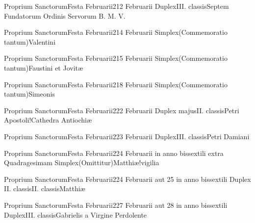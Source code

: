 \documentclass[nocturnale-romanum.tex]{subfiles}
\begin{document}
	{Proprium Sanctorum}{Festa Februarii}{2}{12 Februarii}
	{Duplex}{III. classis}{Septem Fundatorum Ordinis Servorum B. M. V.}
	{}
	{}

	{Proprium Sanctorum}{Festa Februarii}{2}{14 Februarii}
	{Simplex}{(Commemoratio tantum)}{Valentini}
	{}
	{}

	{Proprium Sanctorum}{Festa Februarii}{2}{15 Februarii}
	{Simplex}{(Commemoratio tantum)}{Faustini et Jovitæ}
	{}
	{}

	{Proprium Sanctorum}{Festa Februarii}{2}{18 Februarii}
	{Simplex}{(Commemoratio tantum)}{Simeonis}
	{}
	{}

	{Proprium Sanctorum}{Festa Februarii}{2}{22 Februarii}
	{Duplex majus}{II. classis}{Petri Apostoli!Cathedra Antiochiæ}
	{}
	{}

	{Proprium Sanctorum}{Festa Februarii}{2}{23 Februarii}
	{Duplex}{III. classis}{Petri Damiani}
	{}
	{}

	{Proprium Sanctorum}{Festa Februarii}{2}{24 Februarii in anno bissextili extra Quadragesimam}
	{Simplex}{(Omittitur)}{Matthiæ!vigilia}
	{}
	{}
\invitferia

	{Proprium Sanctorum}{Festa Februarii}{2}{24 Februarii aut 25 in anno bissextili}
	{Duplex II. classis}{II. classis}{Matthiæ}
	{}
	{}

	{Proprium Sanctorum}{Festa Februarii}{2}{27 Februarii aut 28 in anno bissextili}
	{Duplex}{III. classis}{Gabrielis a Virgine Perdolente}
	{}
	{}
\end{document}
